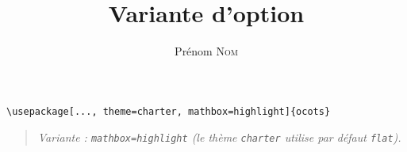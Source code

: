 \documentclass[11pt]{ocots-book}
\title{Variante d'option}
\author{Prénom \textsc{Nom}}
\newcommand{\ocotsvariantnote}[1]{\begin{quote}\itshape Variante : #1\end{quote}}
\begin{document}
\maketitle

\begin{lstlisting}
\usepackage[..., theme=charter, mathbox=highlight]{ocots}
\end{lstlisting}
\ocotsvariantnote{\texttt{mathbox=highlight} (le th\`eme \texttt{charter} utilise par d\'efaut \texttt{flat}).}

\end{document}
